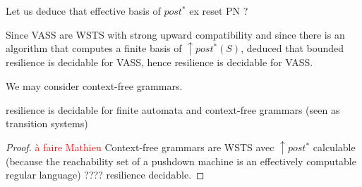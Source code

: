 Let us deduce that effective basis of $post^*$ ex reset PN ?

Since VASS are WSTS with strong upward compatibility and since there is an algorithm that computes a finite basis of  $\uparrow post^*(S)$, \cite{DBLP:conf/gg/Ozkan22} deduced that bounded resilience is decidable for VASS, hence resilience is decidable for VASS. 

We may consider context-free grammars.

\begin{corollary}
{\sc resilience} is decidable for finite automata and context-free grammars (seen as transition systems)
\end{corollary}

\begin{proof}

  \textcolor{red}{à faire Mathieu}
Context-free grammars are WSTS \cite{DBLP:journals/tcs/FinkelS01} avec $\uparrow post^*$ calculable (because the reachability set of a pushdown machine is an effectively computable regular language) ???? resilience decidable.
\end{proof}


\cite{DBLP:journals/ipl/BouajjaniEFMRWW00}


